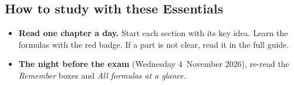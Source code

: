 \documentclass[11pt,a4paper,oneside,openany]{book}
\begin{document}
\subsection*{How to study with these Essentials}
\begin{itemize}[itemsep=1pt]
  \item \textbf{Read one chapter a day.} Start each section with its key idea. Learn the
        formulas with the red badge. If a part is not clear, read it in the full guide.
  \item \textbf{The night before the exam} (Wednesday 4~November 2026), re-read the
        \emph{Remember} boxes and \emph{All formulas at a glance}.
\end{itemize}

{\setlength\parskip{0pt plus 0.5pt}\tableofcontents}


\end{document}
